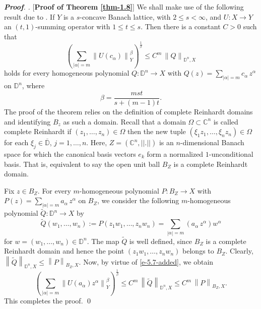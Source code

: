 \documentclass[a4paper,11pt, reqno]{amsart}
\theoremstyle{definition}
\newenvironment{pf}[1][]{%
	\vskip 3mm
	\noindent
	\ifthenelse{\equal{#1}{}}%
	{{\slshape {\bf Proof}. }}%
	{{\slshape #1.} }%
}%
{\qed\bigskip}
\newcommand{\norm}[1]{\left\lVert#1\right\rVert}
\begin{document}
	\begin{pf} [{\bf Proof of Theorem \ref{thm-1.8}}]
	We shall make use of the following result due to \cite[Theorem 5.3]{defant-2012}. If $Y$ is a $s$-concave Banach lattice, with $2\leq s < \infty$, and $U: X \rightarrow Y$ an $(t,1)$-summing operator with $1 \leq t \leq s$. Then there is a constant $C>0$ such that
	\begin{equation} \label{e-5.7-added}
		\left(\sum_{|\alpha|=m} \norm{U(c_{\alpha})}^{\beta}_{Y}\right)^{\frac{1}{\beta}} \leq C^m \, \norm{Q}_{\mathbb{D}^n,X}
	\end{equation}
	holds for every homogeneous polynomial $Q: \mathbb{D}^n \rightarrow X$ with $Q(z)=\sum_{|\alpha|=m} c_{\alpha}\, z^{\alpha}$ on $\mathbb{D}^n$, where 
	\begin{equation*}
		\beta= \frac{mst}{s+ (m-1)t}.
	\end{equation*}	
The proof of the theorem relies on the definition of complete Reinhardt domains and identifying $B_z$ as such a domain.  Recall that a domain $\Omega \subset \mathbb{C}^n$ is called complete Reinhardt if $(z_{1}, \ldots,z_{n}) \in \Omega$ then the new tuple $(\xi_1 z_1, \ldots , \xi _nz_n) \in \Omega$ for each $\xi_j \in \overline{\mathbb{D}}$, $j=1, \ldots,n$.
Here, $Z=(\mathbb{C}^n, ||.||)$ is an $n$-dimensional Banach space for which the canonical basis vectors $e_{k}$ form a normalized $1$-unconditional basis. That is, equivalent to say the open unit ball $B_{Z}$ is a complete Reinhardt domain.
 
Fix $z \in B_{Z}$. For every $m$-homogeneous polynomial $P: B_{Z} \rightarrow X$ with $P(z)=\sum_{|\alpha|=m} a_{\alpha}\, z^{\alpha}$ on $B_{Z}$, we consider the following $m$-homogeneous polynomial $\tilde{Q}: \mathbb{D}^n \rightarrow X$ by 
\begin{equation*}
	\tilde{Q}(w_1, \ldots,w_n):=P(z_1w_1, \ldots , z_nw_n)= \sum_{|\alpha|=m} (a_{\alpha}\, z^{\alpha}) w^{\alpha}
\end{equation*}
for $w=(w_1, \ldots ,w_n) \in \mathbb{D}^n$. The map $\tilde{Q}$ is well defined, since $B_Z$ is a complete Reinhardt domain and hence the point $(z_1w_1, \ldots , z_nw_n)$ belongs to $B_Z$. Clearly, $\norm{\tilde{Q}}_{\mathbb{D}^n,X} \leq \norm{P}_{B_{Z},X}$. Now, by virtue of \eqref{e-5.7-added}, we obtain
\begin{equation*} 
	\left(\sum_{|\alpha|=m} \norm{U(a_{\alpha})z^{\alpha}}^{\beta}_{Y}\right)^{\frac{1}{\beta}} \leq C^m \, \norm{\tilde{Q}}_{\mathbb{D}^n,X} \leq C^m \, \norm{P}_{B_{Z},X}.
\end{equation*}
This completes the proof.
	\end{pf}
	
\end{document}
